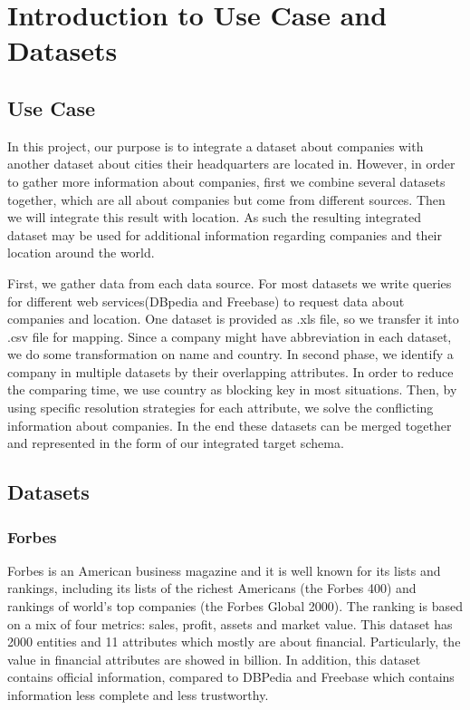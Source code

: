 \section{Introduction to Use Case and Datasets}
\subsection{Use Case}
In this project, our purpose is to integrate a dataset about companies with another dataset about cities their headquarters are located in. However, in order to gather more information about companies, first we combine several datasets together, which are all about companies but come from different sources. Then we will integrate this result with location. As such the resulting integrated dataset may be used for additional information regarding companies and their location around the world.

First, we gather data from each data source. For most datasets we write queries for different web services(DBpedia and Freebase) to request data about companies and location. One dataset is provided as .xls file, so we transfer it into .csv file for mapping. Since a company might have abbreviation in each dataset, we do some transformation on name and country.
In second phase, we identify a company in multiple datasets by their overlapping attributes. In order to reduce the comparing time, we use country as blocking key in most situations.
Then, by using specific resolution strategies for each attribute, we solve the conflicting information about companies. In the end these datasets can be merged together and represented in the form of our integrated target schema.
%

\subsection{Datasets}
\subsubsection{Forbes}
Forbes is an American business magazine and it is well known for its lists and rankings, including its lists of the richest Americans (the Forbes 400) and rankings of world's top companies (the Forbes Global 2000). The ranking is based on a mix of four metrics: sales, profit, assets and market value. This dataset has 2000 entities and 11 attributes which mostly are about financial. Particularly, the value in financial attributes are showed in billion. In addition, this dataset contains official information, compared to DBPedia and Freebase which contains information less complete and less trustworthy.
